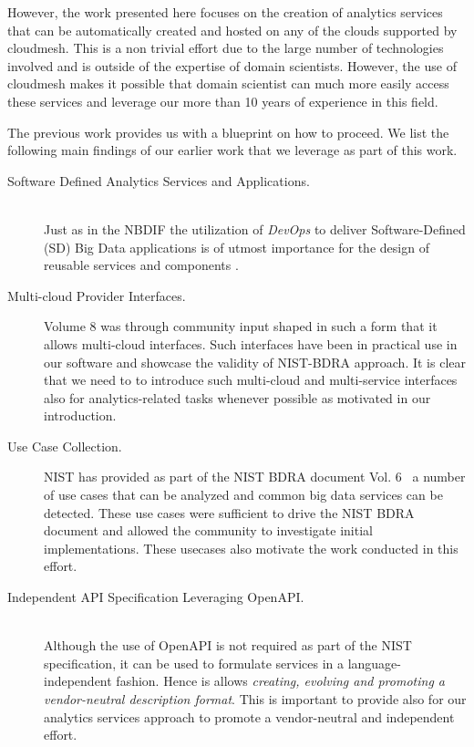 However, the work presented here focuses on the creation of analytics services that can be automatically created and hosted on any of the clouds supported by cloudmesh. This is a non trivial effort due to the large number of technologies involved and is outside of the expertise of domain scientists. However, the use of cloudmesh makes it possible that domain scientist can much more easily access these services and leverage our more than 10 years of experience in this field.

The previous work provides us with a blueprint on how to proceed.  We list the following main findings of our earlier work that we leverage as part of this work.

\begin{description}
  
\item[Software Defined Analytics Services and Applications.] ~\\ 
  Just as
  in the NBDIF the utilization of \emph{DevOps} to deliver
  Software-Defined (SD) Big Data applications is of
 utmost importance for the design of reusable services and components \cite{cloudmesh-manual,bigdata-stack-1,bigdata-stack-2}. 
  
\item[Multi-cloud Provider Interfaces.] Volume 8 was through community
  input shaped in such a form that it allows multi-cloud
  interfaces. Such interfaces have been in practical use in our
  software and showcase the validity of NIST-BDRA approach. It is
  clear that we need to to introduce such multi-cloud and multi-service
  interfaces also for analytics-related tasks whenever possible as motivated in our introduction. 

\item[Use Case Collection.] NIST has provided as part of the NIST BDRA
  document Vol. 6~\cite{nist-v6} a number of use cases that can be
  analyzed and common big data services can be detected. These use
  cases were sufficient to drive the NIST BDRA document \cite{nist-v6}
  and allowed the community to investigate initial implementations. These usecases also motivate the work conducted in this effort.

\item[Independent API Specification Leveraging OpenAPI.] ~\\ Although the
  use of OpenAPI \cite{openapi,openapi-tools} is not required as part
  of the NIST specification, it can be used to formulate services in a
  language-independent fashion. Hence is allows {\em creating, evolving
  and promoting a vendor-neutral description format}. This is 
  important to provide also for our analytics services approach to
  promote a vendor-neutral and independent effort.


\end{description}
